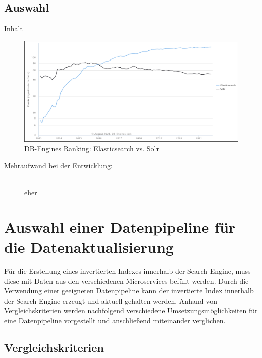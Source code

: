 \subsection{Auswahl\label{subsec4.1.5:Unterunterpunkt-5}}

Inhalt

\begin{figure}[H]
    \centering
    \includegraphics[width=0.9\linewidth]{images/elasticvssolr.png}
    \caption{DB-Engines Ranking: Elasticsearch vs. Solr \cite{DBEngines.2021}}
    \label{fig:elasticvssolr}
\end{figure}

\begin{description}
    \item[Mehraufwand bei der Entwicklung:]\hfill \\
    eher

\end{description}

\section{Auswahl einer Datenpipeline für die Datenaktualisierung\label{sec4.2:Unterpunkt-2}}

Für die Erstellung eines invertierten Indexes innerhalb der Search Engine, muss diese mit Daten aus den verschiedenen Microservices befüllt werden. Durch die Verwendung einer geeigneten Datenpipeline kann der invertierte Index innerhalb der Search Engine erzeugt und aktuell gehalten werden. Anhand von Vergleichskriterien werden nachfolgend verschiedene Umsetzungsmöglichkeiten für eine Datenpipeline vorgestellt und anschließend miteinander verglichen.

\subsection{Vergleichskriterien\label{subsec4.2.1:Unterunterpunkt-1}}


